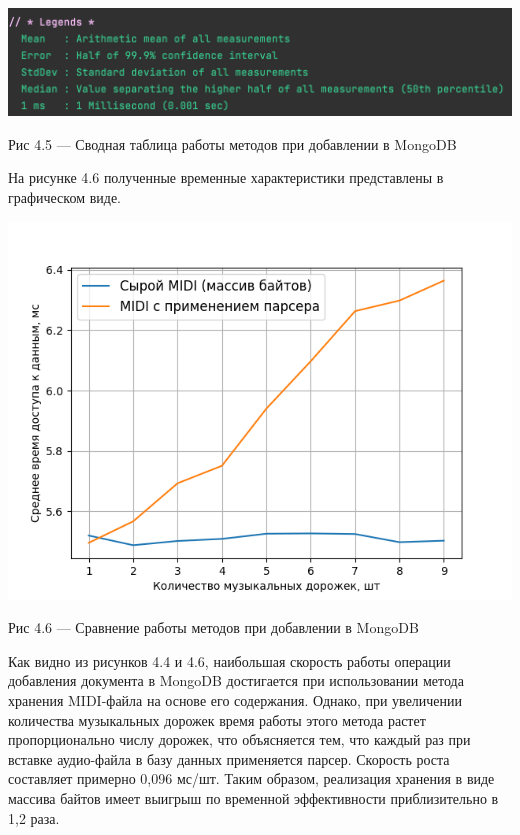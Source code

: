 \begin{center}
		\includegraphics[scale=0.6]{tex/img/Legends.png}
		
			Рис 4.5 — Сводная таблица работы методов при добавлении в MongoDB
\end{center}

На рисунке 4.6 полученные временные характеристики представлены в графическом виде.

\begin{center}
		\includegraphics[scale=0.7]{tex/img/figure_insert_query.png}
		
			Рис 4.6 — Сравнение работы методов при добавлении в MongoDB
\end{center}

Как видно из рисунков 4.4 и 4.6, наибольшая скорость работы операции добавления документа в MongoDB достигается при использовании метода хранения MIDI-файла на основе его содержания. Однако, при увеличении количества музыкальных дорожек время работы этого метода растет пропорционально числу дорожек, что объясняется тем, что каждый раз при вставке аудио-файла в базу данных применяется парсер. Скорость роста составляет примерно 0,096 мс/шт. Таким образом, реализация хранения в виде массива байтов имеет выигрыш по временной эффективности приблизительно в 1,2 раза.

